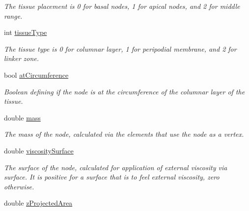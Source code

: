 \begin{DoxyCompactItemize}
\begin{DoxyCompactList}\small\item\em The tissue placement is 0 for basal nodes, 1 for apical nodes, and 2 for middle range. \end{DoxyCompactList}\item 
\hypertarget{classNode_ae621097f98f1d33d283cf65a0a02d29a}{}int \hyperlink{classNode_ae621097f98f1d33d283cf65a0a02d29a}{tissue\+Type}\label{classNode_ae621097f98f1d33d283cf65a0a02d29a}

\begin{DoxyCompactList}\small\item\em The tissue type is 0 for columnar layer, 1 for peripodial membrane, and 2 for linker zone. \end{DoxyCompactList}\item 
\hypertarget{classNode_ab6b225354ad961f2e9bd5d7fe9b67b3a}{}bool \hyperlink{classNode_ab6b225354ad961f2e9bd5d7fe9b67b3a}{at\+Circumference}\label{classNode_ab6b225354ad961f2e9bd5d7fe9b67b3a}

\begin{DoxyCompactList}\small\item\em Boolean defining if the node is at the circumference of the columnar layer of the tissue. \end{DoxyCompactList}\item 
\hypertarget{classNode_a63e510fc9158eb15e751861bc14eae38}{}double \hyperlink{classNode_a63e510fc9158eb15e751861bc14eae38}{mass}\label{classNode_a63e510fc9158eb15e751861bc14eae38}

\begin{DoxyCompactList}\small\item\em The mass of the node, calculated via the elements that use the node as a vertex. \end{DoxyCompactList}\item 
\hypertarget{classNode_a7a585da74654d80d5f94805e39c1e2ad}{}double \hyperlink{classNode_a7a585da74654d80d5f94805e39c1e2ad}{viscosity\+Surface}\label{classNode_a7a585da74654d80d5f94805e39c1e2ad}

\begin{DoxyCompactList}\small\item\em The surface of the node, calculated for application of external viscosity via surface. It is positive for a surface that is to feel external viscosity, zero otherwise. \end{DoxyCompactList}\item 
\hypertarget{classNode_af8e9678dfeffc9e99d925a83b58fde3d}{}double \hyperlink{classNode_af8e9678dfeffc9e99d925a83b58fde3d}{z\+Projected\+Area}\label{classNode_af8e9678dfeffc9e99d925a83b58fde3d}


\end{DoxyCompactItemize}

